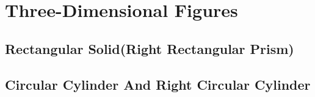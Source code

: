 \documentclass[
	11pt, %
	handout,
]{beamer}
\begin{document}


\section{Three-Dimensional Figures}


\subsection{Rectangular Solid(Right Rectangular Prism)}


\subsection{Circular Cylinder And Right Circular Cylinder}











\end{document}
